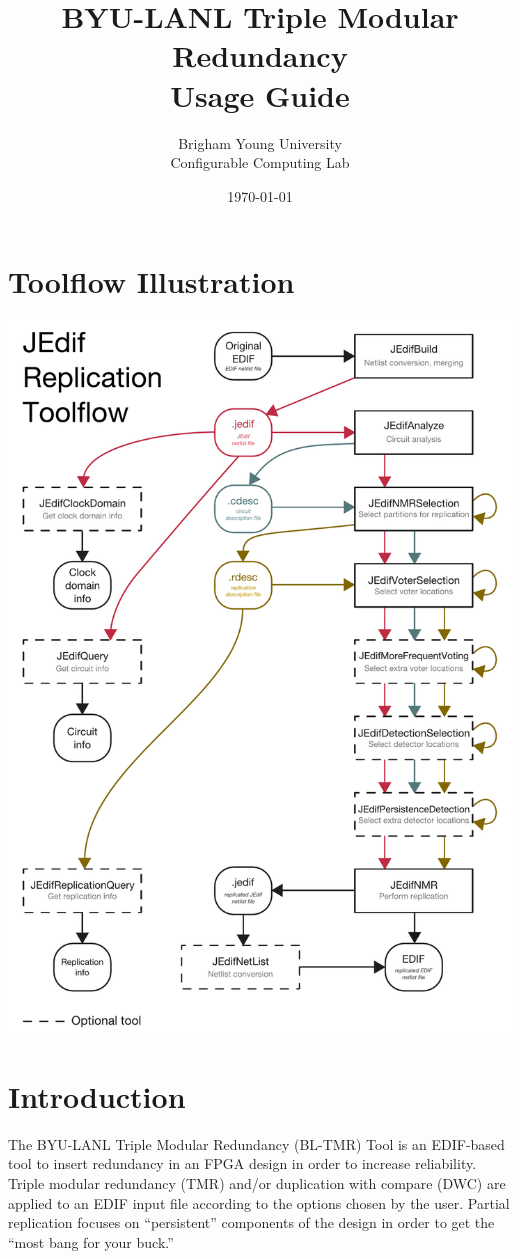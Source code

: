 \documentclass[english]{article}
\title{BYU-LANL Triple Modular Redundancy \\ Usage Guide \\  }
\author{Brigham Young University \\ Configurable Computing Lab}
\date{\today}
\numberwithin{figure}{section}
\begin{document}
\maketitle

\newpage
\tableofcontents
\newpage

\section{Toolflow Illustration}
\includegraphics[scale=0.7]{tool_flow.pdf}
\newpage


\section{Introduction}
The BYU-LANL Triple Modular Redundancy (BL-TMR) Tool is an EDIF-based
tool to insert redundancy in an FPGA design in order to increase
reliability. Triple modular redundancy (TMR) and/or duplication with
compare (DWC) are applied to an EDIF input file according to the
options chosen by the user. Partial replication focuses on ``persistent''
components of the design in order to get the ``most bang for your buck.''
\end{document}
